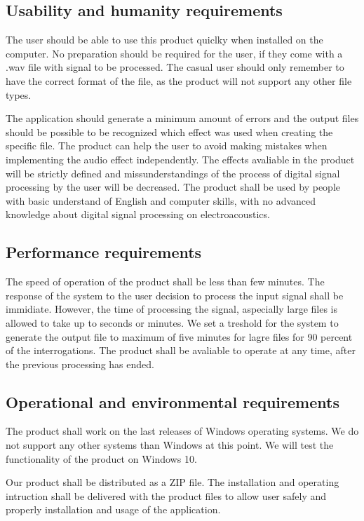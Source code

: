 \documentclass[12pt]{article}
\begin{document}
\subsection{Usability and humanity requirements}

	The user should be able to use this product quiclky when installed on the computer. No preparation should be required for the user, if they come with a .wav file with signal to be processed. The casual user should only remember to have the correct format of the file, as the product will not support any other file types.
	
	The application should generate a minimum amount of errors and the output files should be possible to be recognized which effect was used when creating the specific file. The product can help the user to avoid making mistakes when implementing the audio effect independently. The effects avaliable in the product will be strictly defined and missunderstandings of the process of digital signal processing by the user will be decreased. The product shall be used by people with basic understand of English and computer skills, with no advanced knowledge about digital signal processing on electroacoustics.

\subsection{Performance requirements}

	The speed of operation of the product shall be less than few minutes. The response of the system to the user decision to process the input signal shall be immidiate. However, the time of processing the signal, aspecially large files is allowed to take up to seconds or minutes. We set a treshold for the system to generate the output file to maximum of five minutes for lagre files for 90 percent of the interrogations. The product shall be avaliable to operate at any time, after the previous processing has ended.

\subsection{Operational and environmental requirements}

	The product shall work on the last releases of Windows operating systems. We do not support any other systems than Windows at this point. We will test the functionality of the product on Windows 10.
	
	Our product shall be distributed as a ZIP file. The installation and operating intruction shall be delivered with the product files to allow user safely and properly installation and usage of the application.
	
\end{document}
